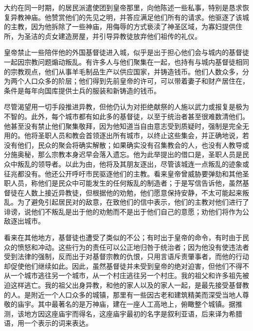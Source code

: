 大约在同一时期，的居民派遣使团到皇帝那里，向他陈述一些私事，特别是恳求恢复异教神庙。他赞赏他们的先见之明，并答应满足他们所有的请求。他驱逐了该城的主教，因为他拆除了一些神庙，用侮辱的方式亵渎了神圣区域，为寡妇提供住所，为圣洁的贞女建造房屋，并引导异教徒放弃他们祖传的礼仪。\par

皇帝禁止一些陪伴他的外国基督徒进入城，似乎是出于担心他们会与城内的基督徒一起因宗教问题煽动叛乱。有许多人与他们聚集在一起，也持有与城内基督徒相同的宗教观点，他们从事羊毛制品生产以供应国家，并铸造钱币。他们人数众多，分为两个人口众多的阶层；他们得到先前皇帝的许可，可以带着妻子和财产居住在，条件是每年向国库提供士兵的服装和新铸造的钱币。\par

尽管渴望用一切手段推进异教，但他仍认为对拒绝献祭的人施以武力或报复是极为不智的。此外，每个城市都有如此多的基督徒，以至于统治者甚至很难数清他们。他甚至没有禁止他们聚集敬拜，因为他知道当自由意志受到质疑时，强制是完全无用的。他将圣职人员和教会首领逐出所有城市，以终止这些集会，并正确地说，若没有他们，民众的聚会将确实解散；如果确实没有召集教会的人，也没有人教导或分施奥秘，那么宗教本身迟早会落入遗忘。他为此举提出的借口是，圣职人员是民众中叛乱的领导者。以此为由，他将及其朋友逐出，尽管该城连一点叛乱的迹象或征兆都没有。他还公开呼吁市民驱逐他们的主教。看来皇帝曾威胁要弹劾和其他圣职人员，称他们是民众中可能发生的任何叛乱的制造者；于是写信告诉他，虽然基督徒在人数上接近异教徒，但根据他的劝勉，他们愿意保持安静，不太可能起来叛乱。为了避免引起居民对的敌意，在致他们的信中表示，他们的主教对他们进行了诽谤，说他们不叛乱是出于他的劝勉而不是出于他们自己的意愿；劝他们将作为公敌逐出城市。\par

看来在其他地方，基督徒也遭受了类似的不公；有时出于皇帝的命令，有时由于民众的愤怒和冲动。这些行为的责任可以公正地归咎于统治者；因为他没有使违法者受到法律的强制，反而出于对基督宗教的仇恨，只用言语斥责肇事者，而他的行动却促使他们继续如此。因此，虽然基督徒并未受到皇帝的绝对迫害，但他们不得不从一个城市逃往另一个城市，从一个村庄逃往另一个村庄。我的祖父和许多祖先被迫这样逃亡。我的祖父出身异教，和他的家人以及的家人一起，是最先接受基督教的人。是附近一个人口众多的城镇，那里有一些因古老和建筑精美而深受当地人尊敬的庙宇。其中最著名的是万神庙，建在一座人工高地上，俯瞰整个城镇。据推测，该地方因这座庙宇而得名，这座庙宇最初的名字是叙利亚语，后来译为希腊语，用一个表示的词来表达。\par

